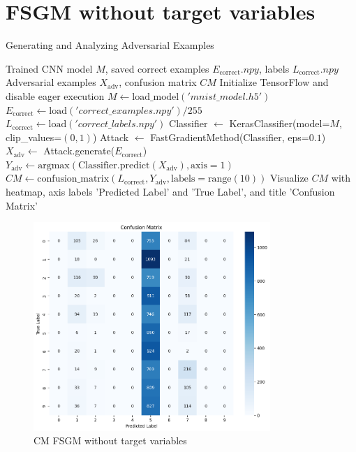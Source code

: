 \documentclass[11pt,onside]{article}
\begin{document}
\section{FSGM without target variables}
\begin{algorithm}[H]
\caption{Generating and Analyzing Adversarial Examples}
\begin{algorithmic}[1]
\Require Trained CNN model $M$, saved correct examples $E_{\text{correct}}.npy$, labels $L_{\text{correct}}.npy$
\Ensure Adversarial examples $X_{\text{adv}}$, confusion matrix $CM$
\State Initialize TensorFlow and disable eager execution
\State $M \gets \text{load\_model}('mnist\_model.h5')$
\State $E_{\text{correct}} \gets \text{load}('correct\_examples.npy') / 255$
\State $L_{\text{correct}} \gets \text{load}('correct\_labels.npy')$
\State Classifier $\gets$ KerasClassifier(model=$M$, clip\_values=$(0, 1)$)
\State Attack $\gets$ FastGradientMethod(Classifier, eps=$0.1$)
\State $X_{\text{adv}} \gets$ Attack.generate($E_{\text{correct}}$)
\State $Y_{\text{adv}} \gets \text{argmax}(\text{Classifier.predict}(X_{\text{adv}}), \text{axis}=1)$
\State $CM \gets \text{confusion\_matrix}(L_{\text{correct}}, Y_{\text{adv}}, \text{labels}=\text{range}(10))$
\State Visualize $CM$ with heatmap, axis labels 'Predicted Label' and 'True Label', and title 'Confusion Matrix'
\end{algorithmic}
\end{algorithm}


\begin{figure}[h]
\centering
\includegraphics[width=0.8\textwidth]{V1_images/FGM_without_target.png}
\caption{CM FSGM without target variables}
\label{fig: FSGM without target variables}
\end{figure}
\end{document}
